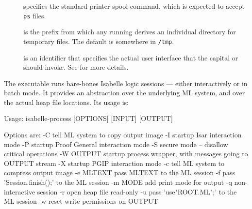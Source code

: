 \begin{isabellebody}
\begin{isamarkuptext}
\begin{description}
  \item[\hypertarget{setting.PRINT-COMMAND}{\hyperlink{setting.PRINT-COMMAND}{\mbox{}}}] specifies the standard printer
  spool command, which is expected to accept \verb|ps| files.
  
  \item[\hypertarget{setting.ISABELLE-TMP-PREFIX}{\hyperlink{setting.ISABELLE-TMP-PREFIX}{\mbox{}}}\isa{{\isachardoublequote}\isactrlsup {\isacharasterisk}{\isachardoublequote}}] is the
  prefix from which any running \hyperlink{executable.isabelle-process}{\mbox{}}
  derives an individual directory for temporary files.  The default is
  somewhere in \verb|/tmp|.
  
  \item[\hypertarget{setting.ISABELLE-INTERFACE}{\hyperlink{setting.ISABELLE-INTERFACE}{\mbox{}}}] is an identifier that
  specifies the actual user interface that the capital \hyperlink{executable.Isabelle}{\mbox{}} or \hyperlink{executable.isabelle-interface}{\mbox{}} should invoke.  See
   for more details.

  \end{description}%
\end{isamarkuptext}%
\isamarkuptrue%
%
\isamarkuptrue%
%
\begin{isamarkuptext}%
The \hypertarget{executable.isabelle-process}{\hyperlink{executable.isabelle-process}{\mbox{}}} executable runs bare-bones
  Isabelle logic sessions --- either interactively or in batch mode.
  It provides an abstraction over the underlying ML system, and over
  the actual heap file locations.  Its usage is:

\begin{ttbox}
Usage: isabelle-process [OPTIONS] [INPUT] [OUTPUT]

  Options are:
    -C           tell ML system to copy output image
    -I           startup Isar interaction mode
    -P           startup Proof General interaction mode
    -S           secure mode -- disallow critical operations
    -W OUTPUT    startup process wrapper, with messages going to OUTPUT stream
    -X           startup PGIP interaction mode
    -c           tell ML system to compress output image
    -e MLTEXT    pass MLTEXT to the ML session
    -f           pass 'Session.finish();' to the ML session
    -m MODE      add print mode for output
    -q           non-interactive session
    -r           open heap file read-only
    -u           pass 'use"ROOT.ML";' to the ML session
    -w           reset write permissions on OUTPUT


\end{ttbox}
\end{isamarkuptext}
\end{isabellebody}
